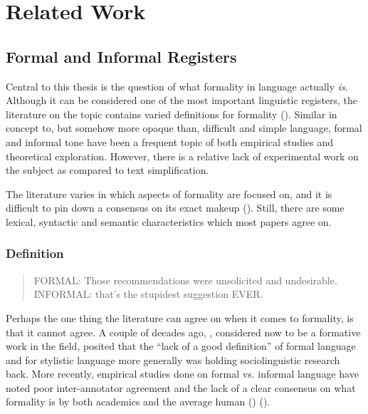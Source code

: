 \chapter{Related Work}

\label{Chapter02}

\section{Formal and Informal Registers}

Central to this thesis is the question of what formality in language actually \textit{is}. Although it can be considered one of the most important linguistic registers, the literature on the topic contains varied definitions for formality (\cite{heylighen1999formality}). Similar in concept to, but somehow more opaque than, difficult and simple language, formal and informal tone have been a frequent topic of both empirical studies and theoretical exploration. However, there is a relative lack of experimental work on the subject as compared to text simplification.

The literature varies in which aspects of formality are focused on, and it is difficult to pin down a consensus on its exact makeup (\cite{pavlick2016empirical}). Still, there are some lexical, syntactic and semantic characteristics which most papers agree on.

\subsection{Definition} \label{2.1.1}

\begin{quote}
\small{FORMAL:} \quad\quad Those recommendations were unsolicited and undesirable. \linebreak
\small{INFORMAL:} \quad that's the stupidest suggestion EVER. 
\linebreak {}
\end{quote}

Perhaps the one thing the literature can agree on when it comes to formality, is that it cannot agree. A couple of decades ago, \cite{heylighen1999formality}, considered now to be a formative work in the field, posited that the ``lack of a good definition'' of formal language and for stylistic language more generally was holding sociolinguistic research back. More recently, empirical studies done on formal vs. informal language have noted poor inter-annotator agreement and the lack of a clear consensus on what formality is by both academics and the average human (\cite{lahiri2011informality}) (\cite{pavlick2016empirical}).

